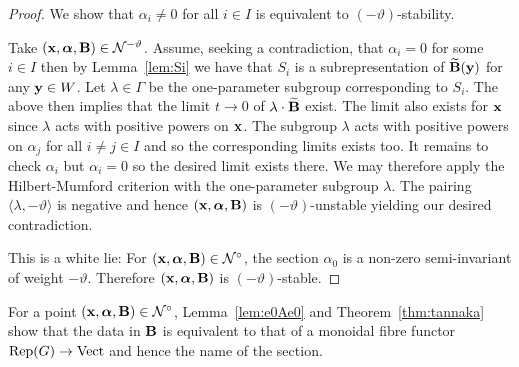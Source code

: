 \documentclass{amsart}
\newcommand{\balpha}{\boldsymbol{\alpha}}
\theoremstyle{definition}
\begin{document}
\begin{proof}
We show that $\alpha_i \neq 0$ for all $i \in I$ is equivalent to $(-\vartheta)$-stability.

Take $(\bfx, \balpha, \bfB) \in \cN^{-\vartheta}$. 
Assume, seeking a contradiction, that $\alpha_i =0$ for some $i \in I$ then by Lemma~\ref{lem:Si} we have that $S_i$ is a subrepresentation of $\widetilde{\mathbf{B}}(\mathbf{y})$ for any $\mathbf{y} \in W$.
Let $\lambda \in \Gamma$ be the one-parameter subgroup corresponding to $S_i$.
The above then implies that the limit $t \rightarrow 0$ of $\lambda \cdot \widetilde{\mathbf{B}}$ exist.
The limit also exists for $\mathbf{x}$ since $\lambda$ acts with positive powers on $\mathbf{x}$.
The subgroup $\lambda$ acts with positive powers on $\alpha_j$ for all $i\neq j\in I$ and so the corresponding limits exists too.
It remains to check $\alpha_i$ but $\alpha_i=0$ so the desired limit exists there.
We may therefore apply the Hilbert-Mumford criterion with the one-parameter subgroup $\lambda$.
The pairing $\langle \lambda, -\vartheta \rangle$ is negative and hence $(\bfx, \balpha, \bfB)$ is $(-\vartheta)$-unstable yielding our desired contradiction.

{\red This is a white lie:}
For $(\bfx, \balpha, \bfB) \in \cN^\circ$, the section $\alpha_0$ is a non-zero semi-invariant of weight $-\vartheta$.
Therefore $(\bfx, \balpha, \bfB)$ is $(-\vartheta)$-stable.
\end{proof}

\begin{remark}
For a point $(\bfx, \balpha, \bfB) \in \cN^\circ$, Lemma~\ref{lem:e0Ae0} and Theorem~\ref{thm:tannaka} show that the data in $\mathbf{B}$ is equivalent to that of a monoidal fibre functor $\operatorname{Rep}(G) \rightarrow \operatorname{Vect}$ and hence the name of the section.
\end{remark}
\end{document}
